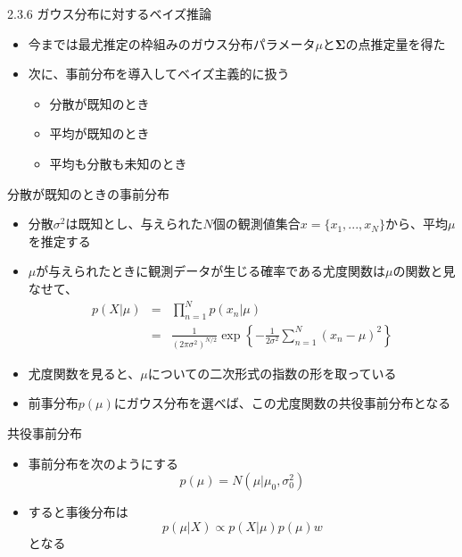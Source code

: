 \begin{frame}{2.3.6 ガウス分布に対するベイズ推論}
 \begin{itemize}
  \item 今までは最尤推定の枠組みのガウス分布パラメータ$\mu$と$\bm{\Sigma}$の点推定量を得た
  \item 次に、事前分布を導入してベイズ主義的に扱う
        \begin{itemize}
         \item 分散が既知のとき
         \item 平均が既知のとき
         \item 平均も分散も未知のとき
        \end{itemize}
 \end{itemize}
\end{frame}

\begin{frame}{分散が既知のときの事前分布}
 \begin{itemize}
  \item \alert{分散$\sigma^2$は既知}とし、与えられた$N$個の観測値集合$x=\{x_1,...,x_N\}$から、平均$\mu$を推定する
  \item $\mu$が与えられたときに観測データが生じる確率である尤度関数は$\mu$の関数と見なせて、
        \begin{eqnarray*}
         p(X|\mu) &= &\prod_{n=1}^{N}p(x_n|\mu) \\
         &=& \frac{1}{(2\pi\sigma^2)^{N/2}}\exp\left\{-\frac{1}{2\sigma^2}\sum_{n=1}^{N}(x_n-\mu)^2\right\}
        \end{eqnarray*}
  \item 尤度関数を見ると、$\mu$についての二次形式の指数の形を取っている
  \item 前事分布$p(\mu)$にガウス分布を選べば、この尤度関数の共役事前分布となる
 \end{itemize}
\end{frame}

\begin{frame}{共役事前分布}
 \begin{itemize}

  \item 事前分布を次のようにする
        \begin{equation}
         p(\mu) = N(\mu|\mu_0,\sigma_0^2)
        \end{equation}
  \item すると事後分布は
        \begin{equation}
         p(\mu|X) \propto p(X|\mu)p(\mu)w
        \end{equation}
        となる
 \end{itemize}
\end{frame}

